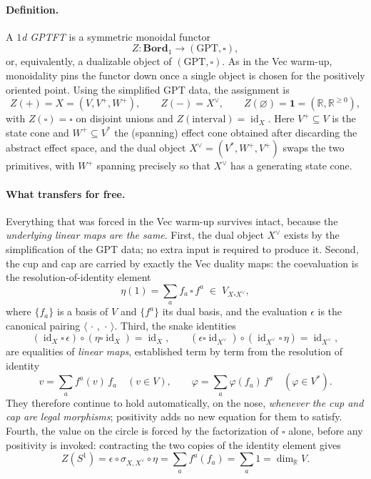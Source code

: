 \documentclass[prl,aps,10pt,superscriptaddress, floatfix]{revtex4-2}
\begin{document}
\paragraph*{Definition.}
A \emph{$1$d GPTFT} is a symmetric monoidal functor
\[
Z:\mathbf{Bord}_1\to(\mathrm{GPT},\square),
\]
or, equivalently, a dualizable object of $(\mathrm{GPT},\square)$. As in the Vec warm-up, monoidality pins the functor down once a single object is chosen for the positively oriented point. Using the simplified GPT data, the assignment is
\[
Z(+)=X=(V,V^+,W^+),\qquad
Z(-)=X^\vee,\qquad
Z(\varnothing)=\mathbf 1=(\mathbb R,\mathbb R^{\ge0}),
\]
with $Z(\square)=\square$ on disjoint unions and $Z(\text{interval})=\operatorname{id}_X$. Here $V^+\subseteq V$ is the state cone and $W^+\subseteq V^*$ the (spanning) effect cone obtained after discarding the abstract effect space, and the dual object $X^\vee=(V^*,W^+,V^+)$ swaps the two primitives, with $W^+$ spanning precisely so that $X^\vee$ has a generating state cone.

\paragraph*{What transfers for free.}
Everything that was forced in the Vec warm-up survives intact, because the \emph{underlying linear maps are the same}. First, the dual object $X^\vee$ exists by the simplification of the GPT data; no extra input is required to produce it. Second, the cup and cap are carried by exactly the Vec duality maps: the coevaluation is the resolution-of-identity element
\[
\eta(1)=\sum_a f_a\,\square\, f^a\;\in\;V_{X\square X^\vee},
\]
where $\{f_a\}$ is a basis of $V$ and $\{f^a\}$ its dual basis, and the evaluation $\epsilon$ is the canonical pairing $\langle\,\cdot\,,\,\cdot\,\rangle$. Third, the snake identities
\[
(\operatorname{id}_X\square\,\epsilon)\circ(\eta\square\operatorname{id}_X)=\operatorname{id}_X,
\qquad
(\epsilon\square\operatorname{id}_{X^\vee})\circ(\operatorname{id}_{X^\vee}\square\,\eta)=\operatorname{id}_{X^\vee},
\]
are equalities of \emph{linear maps}, established term by term from the resolution of identity
\[
v=\sum_a f^a(v)\,f_a\quad(v\in V),\qquad
\varphi=\sum_a \varphi(f_a)\,f^a\quad(\varphi\in V^*).
\]
They therefore continue to hold automatically, on the nose, \emph{whenever the cup and cap are legal morphisms}; positivity adds no new equation for them to satisfy. Fourth, the value on the circle is forced by the factorization of $\square$ alone, before any positivity is invoked: contracting the two copies of the identity element gives
\[
Z(S^1)=\epsilon\circ\sigma_{X,X^\vee}\circ\eta
=\sum_a f^a(f_a)=\sum_a 1=\dim_{\mathbb R}V .
\]
\end{document}
